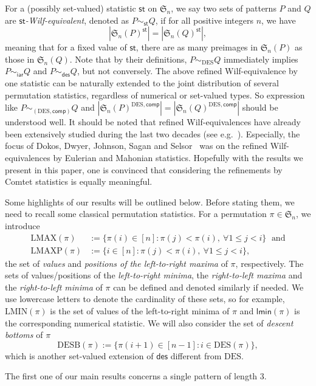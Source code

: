 \documentclass[12pt]{amsart}
\numberwithin{equation}{section}
\theoremstyle{plain}
\theoremstyle{definition}
\def\des{\mathsf{des}}
\def\S{\mathfrak{S}}
\def\iar{\mathsf{iar}}
\def\comp{\mathsf{comp}}
\def\DES{\mathrm{DES}}
\def\LMAX{\mathrm{LMAX}}
\def\LMAXP{\mathrm{LMAXP}}
\def\LMIN{\mathrm{LMIN}}
\def\st{\mathsf{st}}
\def\DESB{\mathrm{DESB}}
\def\lmin{\mathsf{lmin}}
\def\DESB{\mathrm{DESB}}
\begin{document}
For a (possibly set-valued) statistic $\st$ on $\S_n$, we say two sets of patterns $P$ and $Q$ are {\em $\st$-Wilf-equivalent}, denoted as $P\sim_{\st}Q$, if for all positive integers $n$, we have
$$|\S_n(P)^{\st}|=|\S_n(Q)^{\st}|,$$
meaning that for a fixed value of $\st$, there are as many preimages in $\S_n(P)$ as those in $\S_n(Q)$. Note that by their definitions, $P\sim_{\DES}Q$ immediately implies $P\sim_{\iar}Q$ and $P\sim_{\des}Q$, but not conversely. The above refined Wilf-equivalence by one statistic can be naturally extended to the joint distribution of several permutation statistics, regardless of numerical or set-valued types. So expression like $P\sim_{(\DES,\comp)}Q$ and $|\S_n(P)^{\DES,\comp}|=|\S_n(Q)^{\DES,\comp}|$ should be understood well. It should be noted that refined Wilf-equivalences have already been extensively studied during the last two decades (see e.g.~\cite{CK,DDJSS,EP,kit,LK}). Especially, the focus of Dokos, Dwyer, Johnson, Sagan and Selsor~\cite{DDJSS} was on the refined Wilf-equivalences by Eulerian and Mahonian statistics. Hopefully with the results we present in this paper, one is convinced that considering the refinements by Comtet statistics is equally meaningful. 

Some highlights of our results will be outlined below. Before stating them, we need to recall some classical permutation statistics. For a permutation  $\pi\in\S_n$, we introduce 
\begin{align*}
\LMAX(\pi) &:=\{\pi(i)\in[n]:\pi(j)<\pi(i),\: \forall 1\le j < i\} \,\,\; \text{and}\\
\LMAXP(\pi) &:=\{i\in[n]:\pi(j)<\pi(i),\: \forall 1\le j < i\},
\end{align*}
the set of {\em values} and {\em positions of the left-to-right maxima} of $\pi$, respectively. The sets of values/positions of the {\em left-to-right minima}, the {\em right-to-left maxima} and the {\em right-to-left minima} of $\pi$ can be defined and denoted similarly if needed. 
We use lowercase letters to denote the cardinality of these sets, so for example,  $\LMIN(\pi)$ is the set of values of the left-to-right minima of $\pi$ and $\lmin(\pi)$ is the corresponding numerical statistic. We will also consider the set of {\em descent bottoms} of $\pi$
$$\DESB(\pi):=\{\pi(i+1)\in[n-1]: i\in\DES(\pi)\},$$
 which is another set-valued extension of $\des$ different from $\DES$. 
 
 The first one of our main results concerns a single pattern of length $3$.
\end{document}
